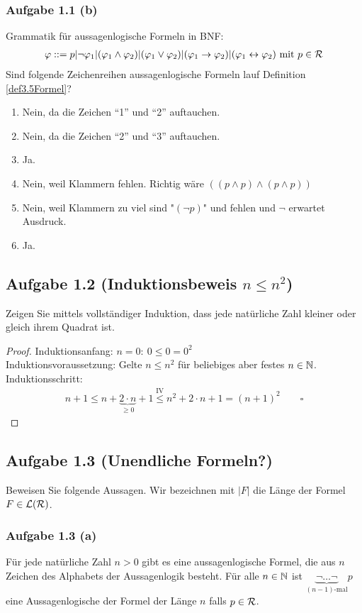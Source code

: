 \subsubsection{Aufgabe 1.1 (b)}
Grammatik für aussagenlogische Formeln in BNF:
\begin{align*}
	\varphi::=p|\neg \varphi_1|(\varphi_1\wedge\varphi_2)|(\varphi_1\vee\varphi_2)|(\varphi_1\to\varphi_2)|(\varphi_1\leftrightarrow\varphi_2)\mit p\in\mathcal{R}
\end{align*}
Sind folgende Zeichenreihen aussagenlogische Formeln lauf Definition \ref{def3.5Formel}?
\begin{enumerate}[label=(\arabic*)]
	\item Nein, da die Zeichen ``1'' und ``2'' auftauchen.
	\item Nein, da die Zeichen ``2'' und ``3'' auftauchen.
	\item Ja.
	\item Nein, weil Klammern fehlen. Richtig wäre $((p\wedge p)\wedge(p\wedge p))$
	\item Nein, weil Klammern zu viel sind "$(\neg p)$" und fehlen und $\neg$ erwartet Ausdruck.
	\item Ja.
\end{enumerate}

\subsection{Aufgabe 1.2 (Induktionsbeweis \texorpdfstring{$n\leq n^2$}{n<=n²})}
Zeigen Sie mittels vollständiger Induktion, dass jede natürliche Zahl kleiner oder gleich
ihrem Quadrat ist.
\begin{proof}
	Induktionsanfang: $n=0:~0\leq0=0^2$\\
	Induktionsvoraussetzung: Gelte $n\leq n^2$ für beliebiges aber festes $n\in\N$.\\
	Induktionsschritt: 
	\begin{align*}
		n+1\leq
		n+\underbrace{2\cdot n}_{\geq0}+1
		\overset{\text{IV}}{\leq} n^2+2\cdot n+1=(n+1)^2\qquad\square
	\end{align*}
\end{proof}

\subsection{Aufgabe 1.3 (Unendliche Formeln?)}
Beweisen Sie folgende Aussagen.
Wir bezeichnen mit $|F|$ die Länge der Formel $F\in\L(\RR)$.

\subsubsection{Aufgabe 1.3 (a)}
Für jede natürliche Zahl $n > 0$ gibt es eine aussagenlogische Formel, die aus $n$ Zeichen des Alphabets der Aussagenlogik besteht.\nl
{} Für alle $n\in\N$ ist $\underbrace{\neg\ldots\neg}_{(n-1)\text{-mal}}p$ eine Aussagenlogische der Formel der Länge $n$ falls $p\in\RR$.

